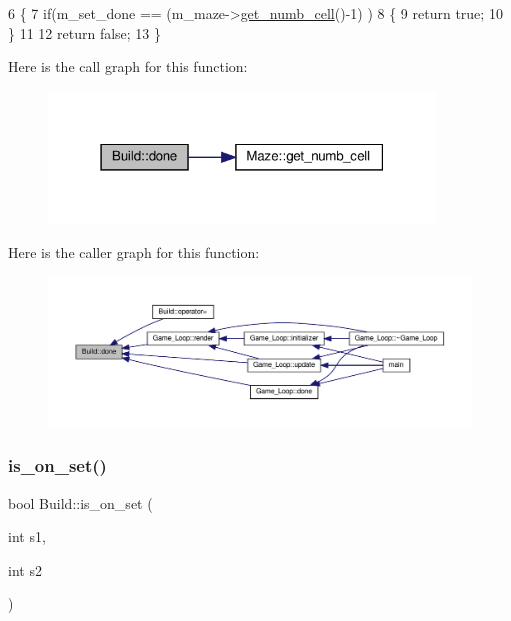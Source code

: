 \begin{DoxyCode}
6 \{
7     \textcolor{keywordflow}{if}(m\_set\_done ==  (m\_maze->\hyperlink{classMaze_a90f5c1c140a9991942204d4a7fec3bf8}{get\_numb\_cell}()-1) )
8     \{
9         \textcolor{keywordflow}{return} \textcolor{keyword}{true};
10     \}
11 
12     \textcolor{keywordflow}{return} \textcolor{keyword}{false};
13 \}
\end{DoxyCode}
Here is the call graph for this function\+:\nopagebreak
\begin{figure}[H]
\begin{center}
\leavevmode
\includegraphics[width=291pt]{classBuild_a72373ff38b0676c8f2c9f171c15333c4_cgraph}
\end{center}
\end{figure}
Here is the caller graph for this function\+:\nopagebreak
\begin{figure}[H]
\begin{center}
\leavevmode
\includegraphics[width=350pt]{classBuild_a72373ff38b0676c8f2c9f171c15333c4_icgraph}
\end{center}
\end{figure}
\mbox{\label{classBuild_ae4eeedfd95306c08d50aff3f620b5a47}} 
\subsubsection{\texorpdfstring{is\+\_\+on\+\_\+set()}{is\_on\_set()}}
{\footnotesize\ttfamily bool Build\+::is\+\_\+on\+\_\+set (\begin{DoxyParamCaption}\item[{int}]{s1,  }\item[{int}]{s2 }\end{DoxyParamCaption})}



